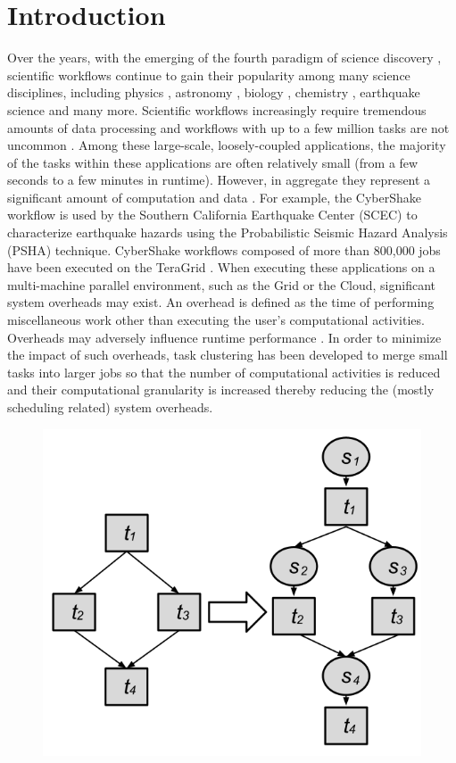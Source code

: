 \chapter{Introduction}


Over the years, with the emerging of the fourth paradigm of science discovery \cite{Hey2009}, scientific workflows continue to gain their popularity among many science disciplines, including physics \cite{Deelman2002}, astronomy \cite{Sakellariou2010}, biology \cite{Lathers2006, Oinn2004}, chemistry \cite{Wieczorek2005}, earthquake science \cite{Maechling2007} and many more. Scientific workflows increasingly require tremendous amounts of data processing and workflows with up to a few million tasks are not uncommon \cite{Callaghan2011}. Among these large-scale, loosely-coupled applications, the majority of the tasks within these applications are often relatively small (from a few seconds to a few minutes in runtime). However, in aggregate they represent a significant amount of computation and data \cite{Deelman2002}. For example, the CyberShake workflow \cite{Rynge2012} is used by the Southern California Earthquake Center (SCEC) \cite{SCEC} to characterize earthquake hazards using the Probabilistic Seismic Hazard Analysis (PSHA) technique. CyberShake workflows composed of more than 800,000 jobs have been executed on the TeraGrid \cite{TeraGrid}. When executing these applications on a multi-machine parallel environment, such as the Grid or the Cloud, significant system overheads may exist. An overhead is defined as the time of performing miscellaneous work other than executing the user's computational activities.  Overheads may adversely influence runtime performance \cite{Overhead2011}. In order to minimize the impact of such overheads, task clustering \cite{Singh2008,Hussin2010,Zhao2009} has been developed to merge small tasks into larger jobs so that the number of computational activities is reduced and their computational granularity is increased thereby reducing the (mostly scheduling related) system overheads. %

\begin{figure}[h!]
\includegraphics[width=0.5\linewidth]{figures/introduction/odag.png}
\centering
  \label{fig:intro_odag}
\end{figure}

